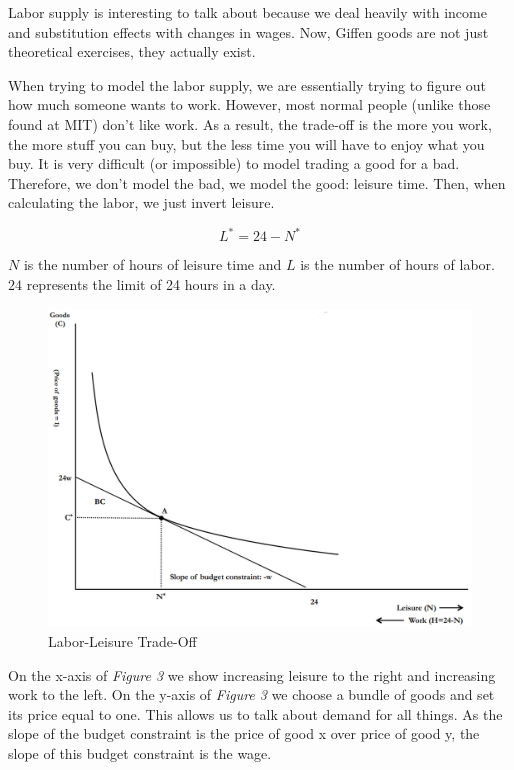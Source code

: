 \documentclass{article}
\begin{document}
Labor supply is interesting to talk about because we deal heavily with income
and substitution effects with changes in wages. Now, Giffen goods are not just
theoretical exercises, they actually exist.

When trying to model the labor supply, we are essentially trying to figure out
how much someone wants to work. However, most normal people (unlike those found
at MIT) don't like work. As a result, the trade-off is the more you work, the
more stuff you can buy, but the less time you will have to enjoy what you buy.
It is very difficult (or impossible) to model trading a good for a bad.
Therefore, we don't model the bad, we model the good: leisure time. Then, when
calculating the labor, we just invert leisure.

$$L^{*}=24-N^{*}$$

$N$ is the number of hours of leisure time and $L$ is the number of hours of
labor. $24$ represents the limit of 24 hours in a day.

\begin{figure}[H]
    \centering
    \includegraphics[scale=0.33]{"Figure 16-3"}
    \caption{Labor-Leisure Trade-Off}
\end{figure}

On the x-axis of \textit{Figure 3} we show increasing leisure to the right and
increasing work to the left. On the y-axis of \textit{Figure 3} we choose a
bundle of goods and set its price equal to one. This allows us to talk about
demand for all things. As the slope of the budget constraint is the price of
good x over price of good y, the slope of this budget constraint is the wage. 
\end{document}
